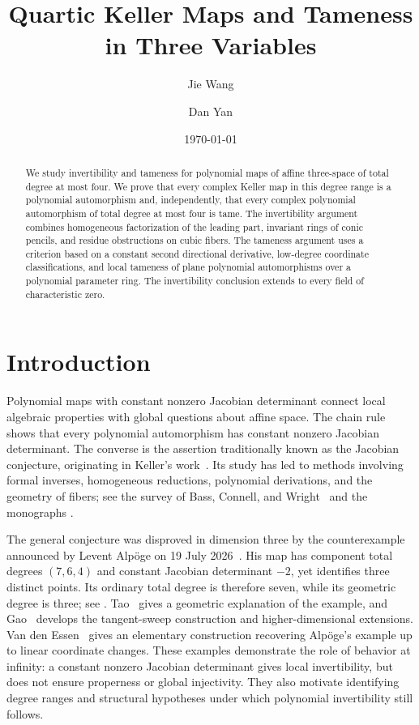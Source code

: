 \documentclass[11pt,reqno]{amsart}
\title[Quartic Keller Maps and Tameness]{Quartic Keller Maps and Tameness in Three Variables}
\author{Jie Wang}
\author{Dan Yan}
\date{\today}
\numberwithin{equation}{section}
\theoremstyle{plain}
\theoremstyle{definition}
\theoremstyle{remark}
\begin{document}
\begin{abstract}
We study invertibility and tameness for polynomial maps of affine three-space
of total degree at most four. We prove that every complex Keller map in this
degree range is a polynomial automorphism and, independently, that every
complex polynomial automorphism of total degree at most four is tame.
The invertibility argument combines homogeneous factorization of the leading
part, invariant rings of conic pencils, and residue obstructions on cubic
fibers. The tameness argument uses a criterion based on a constant second
directional derivative, low-degree coordinate classifications, and local
tameness of plane polynomial automorphisms over a polynomial parameter ring.
The invertibility conclusion extends to every field of characteristic zero.
\end{abstract}
\maketitle

\section{Introduction}\label{sec:introduction}
Polynomial maps with constant nonzero Jacobian determinant connect local
algebraic properties with global questions about affine space. The chain rule
shows that every polynomial automorphism has constant nonzero Jacobian
determinant. The converse is the assertion traditionally known as the
Jacobian conjecture, originating in Keller's work~\cite{Keller}. Its study
has led to methods involving formal inverses, homogeneous reductions,
polynomial derivations, and the geometry of fibers; see the survey of
Bass, Connell, and Wright~\cite{BCW} and the monographs
\cite{Essen,EKC}.

The general conjecture was disproved in dimension three by the
counterexample announced by Levent Alp\"oge on 19 July 2026~\cite{Alpoge}.
His map has component total degrees $(7,6,4)$ and constant Jacobian
determinant $-2$, yet identifies three distinct points. Its ordinary total
degree is therefore seven, while its geometric degree is three; see
\cite[Section~3.4]{Gao}. Tao~\cite{Tao} gives a geometric explanation of
the example, and Gao~\cite{Gao} develops the tangent-sweep construction
and higher-dimensional extensions. Van den Essen~\cite{E26} gives an
elementary construction recovering Alp\"oge's example up to linear
coordinate changes. These examples demonstrate the role
of behavior at infinity: a constant nonzero Jacobian determinant gives
local invertibility, but does not ensure properness or global injectivity.
They also motivate identifying degree ranges and structural hypotheses
under which polynomial invertibility still follows.
\end{document}
